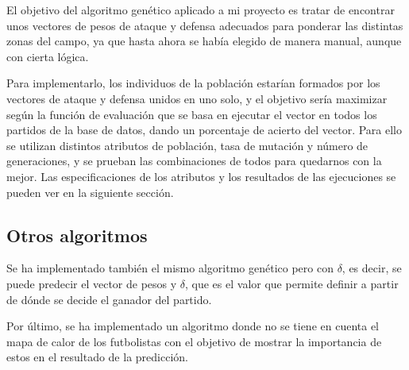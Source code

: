 El objetivo del algoritmo genético aplicado a mi proyecto es tratar de encontrar unos vectores de pesos de ataque y defensa adecuados para ponderar las distintas zonas del campo, ya que hasta ahora se había elegido de manera manual, aunque con cierta lógica.

Para implementarlo, los individuos de la población estarían formados por los vectores de ataque y defensa unidos en uno solo, y el objetivo sería maximizar según la función de evaluación que se basa en ejecutar el vector en todos los partidos de la base de datos, dando un porcentaje de acierto del vector. Para ello se utilizan distintos atributos de población, tasa de mutación y número de generaciones, y se prueban las combinaciones de todos para quedarnos con la mejor. Las especificaciones de los atributos y los resultados de las ejecuciones se pueden ver en la siguiente sección.


\subsection*{Otros algoritmos}
Se ha implementado también el mismo algoritmo genético pero con $\delta$, es decir, se puede predecir el vector de pesos y $\delta$, que es el valor que permite definir a partir de dónde se decide el ganador del partido.

Por último, se ha implementado un algoritmo donde no se tiene en cuenta el mapa de calor de los futbolistas con el objetivo de mostrar la importancia de estos en el resultado de la predicción.



